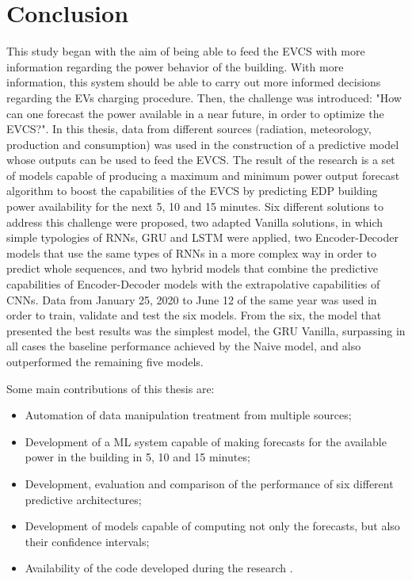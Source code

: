 \cleardoublepage
\label{chap:conclusion}

\section{Conclusion}

This study began with the aim of being able to feed the \ac{EVCS} with more information regarding the power behavior of the building. With more information, this system should be able to carry out more informed decisions regarding the \ac{EV}s charging procedure. Then, the challenge was introduced: "How can one forecast the power available in a near future, in order to optimize the \ac{EVCS}?". In this thesis, data from different sources (radiation, meteorology, production and consumption) was used in the construction of a predictive model whose outputs can be used to feed the \ac{EVCS}. The result of the research is a set of models capable of producing a maximum and minimum power output forecast algorithm to boost the capabilities of the \ac{EVCS} by predicting \ac{EDP} building power availability for the next 5, 10 and 15 minutes. Six different solutions to address this challenge were proposed, two adapted Vanilla solutions, in which simple typologies of \ac{RNN}s, \ac{GRU} and \ac{LSTM} were applied, two Encoder-Decoder models that use the same types of \ac{RNN}s in a more complex way in order to predict whole sequences, and two hybrid models that combine the predictive capabilities of Encoder-Decoder models with the extrapolative capabilities of \ac{CNN}s. Data from January 25, 2020 to June 12 of the same year was used in order to train, validate and test the six models. From the six, the model that presented the best results was the simplest model, the \ac{GRU} Vanilla, surpassing in all cases the baseline performance achieved by the Naive model, and also outperformed the remaining five models.

Some main contributions of this thesis are:
\begin{itemize}
\setlength\itemsep{0.1em}
    \item Automation of data manipulation treatment from multiple sources;
    \item Development of a \ac{ML} system capable of making forecasts for the available power in the building in 5, 10 and 15 minutes;
    \item Development, evaluation and comparison of the performance of six different predictive architectures;
    \item Development of models capable of computing not only the forecasts, but also their confidence intervals;
    \item Availability of the code developed during the research \cite{code}.
    
\end{itemize}

